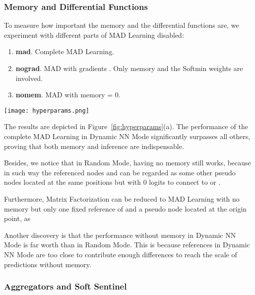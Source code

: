 \documentclass{article}
\begin{document}
\hypertarget{memory-and-differential-functions}{\subsubsection{Memory and Differential Functions}\label{sssec:memory-and-differential-functions}}

To measure how important the memory and the differential functions are,
we experiment with different parts of MAD Learning disabled:

\begin{enumerate}
\item
  \textbf{mad}. Complete MAD Learning.
\item
  \textbf{nograd}. MAD with gradients .
  Only memory and the Softmin weights are involved.
\item
  \textbf{nomem}. MAD with memory  = 0.
\end{enumerate}

\begin{figure*}
\centering
\texttt{[image: hyperparams.png]}
\caption{
  Hits@20 on ogbl-ddi in 25 epochs.
  \textbf{R} in brackets stands for Random Mode in the evaluating phase
  and \textbf{N} for Dynamic NN Mode
}
\label{fig:hyperparams}
\end{figure*}

The results are depicted in Figure~\ref{fig:hyperparams}(a). The performance of the
complete MAD Learning in Dynamic NN Mode significantly surpasses all others,
proving that both memory and inference are indispensable.

Besides, we notice that in Random Mode, having no memory still works,
because in such way the referenced nodes  and  can be regarded as some other
pseudo nodes located at the same positions but with 0 logits to connect to  or .

Furthermore, Matrix Factorization can be reduced to MAD Learning
with no memory but only one fixed reference of  and a pseudo node located at
the origin point, as 

Another discovery is that the performance without memory in Dynamic NN Mode
is far worth than in Random Mode. This is because references in Dynamic
NN Mode are too close to contribute enough differences to reach
the scale of predictions without memory.

\hypertarget{aggregators-and-soft-sentinel}{\subsubsection{Aggregators and Soft Sentinel}\label{sssec:aggregators-and-soft-sentinel}}
\end{document}

